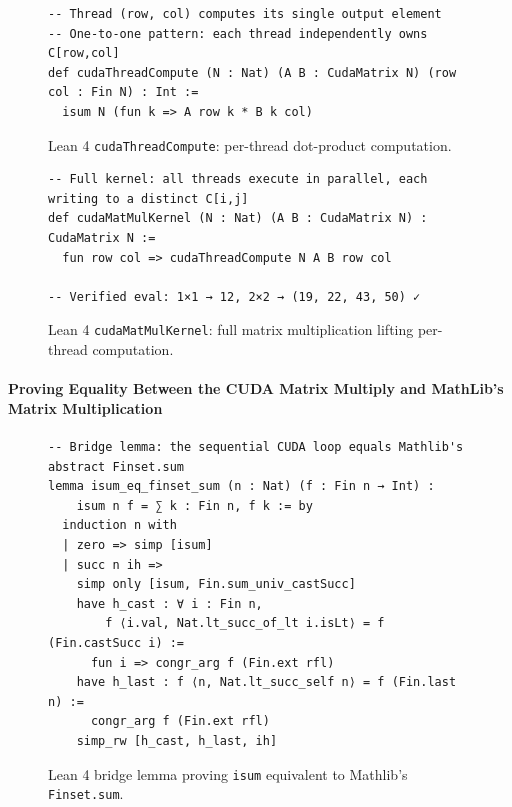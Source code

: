 \documentclass{article}
\begin{document}
\begin{figure}[H]
\begin{verbatim}
-- Thread (row, col) computes its single output element
-- One-to-one pattern: each thread independently owns C[row,col]
def cudaThreadCompute (N : Nat) (A B : CudaMatrix N) (row col : Fin N) : Int :=
  isum N (fun k => A row k * B k col)
\end{verbatim}
\caption{Lean 4 \texttt{cudaThreadCompute}: per-thread dot-product computation.}
\label{fig:lean-threadcompute}
\end{figure}

\begin{figure}[H]
\begin{verbatim}
-- Full kernel: all threads execute in parallel, each writing to a distinct C[i,j]
def cudaMatMulKernel (N : Nat) (A B : CudaMatrix N) : CudaMatrix N :=
  fun row col => cudaThreadCompute N A B row col

-- Verified eval: 1×1 → 12, 2×2 → (19, 22, 43, 50) ✓
\end{verbatim}
\caption{Lean 4 \texttt{cudaMatMulKernel}: full matrix multiplication lifting per-thread computation.}
\label{fig:lean-matmulkernel}
\end{figure}

\paragraph{Proving Equality Between the CUDA Matrix Multiply and MathLib's Matrix Multiplication}

\begin{figure}[H]
\begin{verbatim}
-- Bridge lemma: the sequential CUDA loop equals Mathlib's abstract Finset.sum
lemma isum_eq_finset_sum (n : Nat) (f : Fin n → Int) :
    isum n f = ∑ k : Fin n, f k := by
  induction n with
  | zero => simp [isum]
  | succ n ih =>
    simp only [isum, Fin.sum_univ_castSucc]
    have h_cast : ∀ i : Fin n,
        f ⟨i.val, Nat.lt_succ_of_lt i.isLt⟩ = f (Fin.castSucc i) :=
      fun i => congr_arg f (Fin.ext rfl)
    have h_last : f ⟨n, Nat.lt_succ_self n⟩ = f (Fin.last n) :=
      congr_arg f (Fin.ext rfl)
    simp_rw [h_cast, h_last, ih]
\end{verbatim}
\caption{Lean 4 bridge lemma proving \texttt{isum} equivalent to Mathlib's \texttt{Finset.sum}.}
\label{fig:lean-isum-bridge}
\end{figure}
\end{document}
